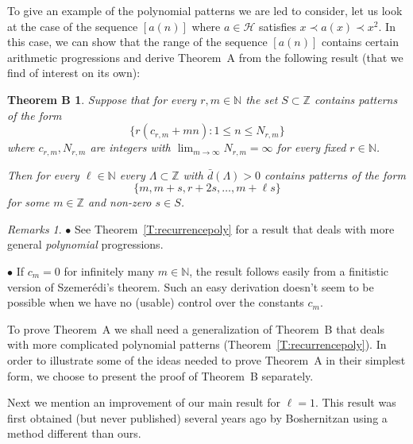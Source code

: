\documentclass[11pt]{amsart}
\renewcommand{\H}{\mathcal{H}}
\newcommand{\N}{\mathbb{N}}
\newcommand{\Z}{\mathbb{Z}}
\theoremstyle{plain}
\newtheorem*{theoremB}{Theorem B}
\theoremstyle{definition}
\theoremstyle{remark}
\newtheorem*{remarks}{Remarks}
\begin{document}
To give an example of the polynomial patterns we are led to
consider, let us look at the case of the sequence $[a(n)]$ where
$a\in \H$ satisfies $x\prec a(x) \prec x^{2}$. In this case, we can
show that the range of the sequence $[a(n)]$ contains certain
arithmetic progressions and derive Theorem~A from the following
result (that we find of interest on its own):
\begin{theoremB}
Suppose that for every $r,m\in \N$ the set $S\subset \Z$
  contains patterns of the form $$\{r(c_{r,m}+mn)\colon 1\leq
  n\leq N_{r,m}\}$$ where $c_{r,m}, N_{r,m}$ are integers with $\lim_{m\to\infty}N_{r,m}=\infty$
  for every fixed $r\in \N$.


  Then for every $\ell \in \N$ every
  $\Lambda\subset\mathbb{Z}$ with $\bar{d}(\Lambda)>0$ contains
  patterns of the form
$$
\{m, m+s,r+2s,\ldots, m+\ell s\}
$$
for some $m\in \Z$ and non-zero $s\in S$.
\end{theoremB}
\begin{remarks}
$\bullet$ See Theorem~\ref{T:recurrencepoly} for a result that deals with more general \emph{polynomial} progressions.

  $\bullet$
   If $c_m=0$ for infinitely many $m\in\N$, the result
  follows easily from a finitistic version of Szemer\'edi's theorem. Such
  an easy derivation doesn't seem to be possible when we have no
  (usable) control over the constants $c_m$.
\end{remarks}
To prove Theorem~A we shall need a generalization of Theorem~B
 that deals with more complicated
polynomial patterns (Theorem~\ref{T:recurrencepoly}).  In order to illustrate some of the ideas needed
to prove Theorem~A in their simplest form, we choose to present the proof of
Theorem~B separately.

Next we mention an improvement of our main result for $\ell=1$. This result was first obtained (but never published) several
    years ago by Boshernitzan using a method different than ours.
\end{document}
